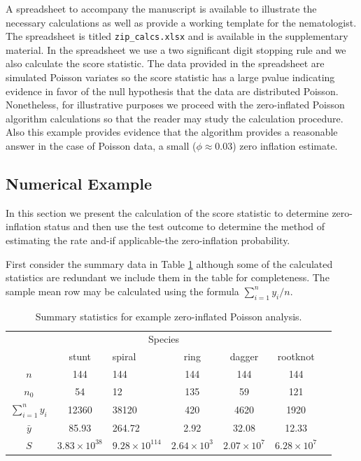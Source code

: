 \documentclass{article}
\begin{document}
A spreadsheet to accompany the manuscript is available to illustrate the necessary calculations as well as provide a working template for the nematologist. The spreadsheet is titled \texttt{zip\_calcs.xlsx} and is available in the supplementary material. In the spreadsheet we use a two significant digit stopping rule and we also calculate the score statistic. The data provided in the spreadsheet are simulated Poisson variates so the score statistic has a large pvalue indicating evidence in favor of the null hypothesis that the data are distributed Poisson. Nonetheless, for illustrative purposes we proceed with the zero-inflated Poisson algorithm calculations so that the reader may study the calculation procedure. Also this example provides evidence that the algorithm provides a reasonable answer in the case of Poisson data, a small ($\phi \approx 0.03$) zero inflation estimate. 

\subsection{Numerical Example} 

In this section we present the calculation of the score statistic to determine zero-inflation status and then use the test outcome to determine the method of estimating the rate and-if applicable-the zero-inflation probability. 

First consider the summary data in Table \ref{tab:table_zip_data} although some of the calculated statistics are redundant we include them in the table for completeness. The sample mean row may be calculated using the formula $\sum_{i=1}^ny_i/n$. 

\begin{table}

\begin{center}
\begin{tabular}{c | c l c  c  c  c  }
\hline
\multicolumn{6}{c}{Species} \\
\cline{1-6}
& stunt & spiral & ring  & dagger & rootknot \\
\hline
$n$& 144 &144  &144 &144 &144  \\
$n_0$ &54  & 12 &135 &59 & 121 \\
$\sum_{i=1}^ny_i$ &12360 & 38120 & 420&4620 &1920 \\
$\bar{y}$ &85.93 &264.72  &2.92 & 32.08& 12.33 \\
$S$ &$3.83\times10^{38}$ &$9.28\times10^{114}$ & $2.64\times10^3$ &$2.07\times10^7$ &$6.28\times10^7$  \\
\hline
\end{tabular}
\end{center}
\caption{Summary statistics for example zero-inflated Poisson analysis. }
 \label{tab:table_zip_data}
\end{table}
\end{document}
